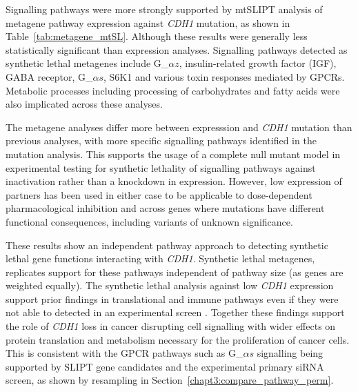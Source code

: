 Signalling pathways were more strongly supported by mtSLIPT analysis of metagene pathway expression against \textit{CDH1} mutation, as shown in Table~\ref{tab:metagene_mtSL}. Although these results were generally less statistically significant than expression analyses. Signalling pathways detected as synthetic lethal metagenes include G_${\alpha z}$, insulin-related growth factor (IGF), GABA receptor, G_${\alpha s}$, S6K1 and various toxin responses mediated by GPCRs. Metabolic processes including processing of carbohydrates and fatty acids were also implicated across these analyses.

The metagene analyses differ more between expresssion and \textit{CDH1} mutation than previous analyses, with more specific signalling pathways identified in the mutation analysis. This supports the usage of a complete null mutant model in experimental testing for synthetic lethality of signalling pathways against  inactivation rather than a knockdown in expression. However, low expression of partners has been used in either case to be applicable to dose-dependent pharmacological inhibition and across genes where mutations have different functional consequences, including variants of unknown significance. 

These results show an independent pathway approach to detecting synthetic lethal gene functions interacting with \textit{CDH1}. Synthetic lethal metagenes, replicates support for these pathways independent of pathway size (as genes are weighted equally). The synthetic lethal analysis against low \textit{CDH1} expression support prior findings in translational and immune pathways even if they were not able to detected in an experimental screen \citep{Telford2015}. Together these findings support the role of \textit{CDH1} loss in cancer disrupting cell signalling with wider effects on protein translation and metabolism necessary for the proliferation of cancer cells. This is consistent with the GPCR pathways such as G_${\alpha s}$ signalling being supported by SLIPT gene candidates and the experimental primary siRNA screen, as shown by resampling in Section~\ref{chapt3:compare_pathway_perm}.


\FloatBarrier


